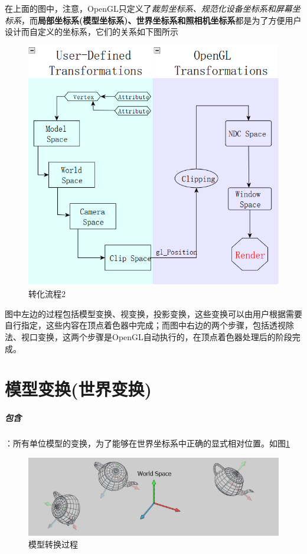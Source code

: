 \documentclass[UTF8,a4paper,12pt]{ctexbook}
\begin{document}
		在上面的图中，注意，OpenGL只定义了\textit{裁剪坐标系、规范化设备坐标系和屏幕坐标系}，而\textbf{局部坐标系(模型坐标系)、世界坐标系和照相机坐标系}都是为了方便用户设计而自定义的坐标系，它们的关系如下图所示
		
		\begin{figure}[htbp]
			\centering
			\includegraphics[scale = 0.9]{transferAll2.png}
			\caption{转化流程2}
		\end{figure}
		
		图中左边的过程包括模型变换、视变换，投影变换，这些变换可以由用户根据需要自行指定，这些内容在顶点着色器中完成；而图中右边的两个步骤，包括透视除法、视口变换，这两个步骤是OpenGL自动执行的，在顶点着色器处理后的阶段完成。
		
	\section{模型变换(世界变换)}
			\subparagraph{包含}：所有单位模型的变换，为了能够在世界坐标系中正确的显式相对位置。如图\ref{mxzh}
				\begin{figure}[htbp]
					\centering
					\includegraphics[scale = 0.7]{transferModel.png}
					\caption{模型转换过程}
					\label{mxzh}
				\end{figure}
			
\end{document}
